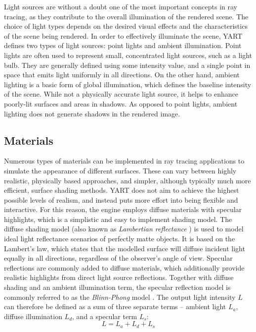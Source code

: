 Light sources are without a doubt one of the most important concepts in ray tracing, as they contribute to the overall illumination of the rendered scene.
The choice of light types depends on the desired visual effects and the characteristics of the scene being rendered.
In order to effectively illuminate the scene, YART defines two types of light sources: point lights and ambient illumination.
Point lights are often used to represent small, concentrated light sources, such as a light bulb. 
They are generally defined using some intensity value, and a single point in space that emits light uniformly in all directions.
On the other hand, ambient lighting is a basic form of global illumination, which defines the baseline intensity of the scene.
While not a physically accurate light source, it helps to enhance poorly-lit surfaces and areas in shadows. 
As opposed to point lights, ambient lighting does not generate shadows in the rendered image.

\subsection{Materials}\label{ch:Implementation/SceneRepresentation/Materials}

Numerous types of materials can be implemented in ray tracing applications to simulate the appearance of different surfaces.
These can vary between highly realistic, physically based approaches, and simpler, although typically much more efficient, surface shading methods.
YART does not aim to achieve the highest possible levels of realism, and instead puts more effort into being flexible and interactive. 
For this reason, the engine employs diffuse materials with specular highlights, which is a simplistic and easy to implement shading model.
The diffuse shading model (also known as \textit{Lambertian reflectance} \supercite{Goral1984}) is used to model ideal light reflectance scenarios of perfectly matte objects. 
It is based on the Lambert's law, which states that the modelled surface will diffuse incident light equally in all directions, regardless of the observer's angle of view.
Specular reflections are commonly added to diffuse materials, which additionally provide realistic highlights from direct light source reflections.
Together with diffuse shading and an ambient illumination term, the specular reflection model is commonly referred to as the \textit{Blinn-Phong} model \supercite{Blinn1977}.
The output light intensity $ L $ can therefore be defined as a sum of three separate terms -- ambient light $ L_a $, diffuse illumination $ L_d $, and a specular term $ L_s $:
%
\begin{equation}
    L = L_a + L_d + L_s \label{eq:Implementation/SceneRepresentation/lighting}
\end{equation}

